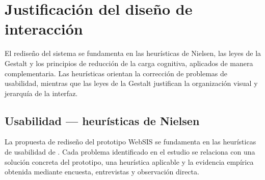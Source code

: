 \section{Justificación del diseño de interacción}

El rediseño del sistema se fundamenta en las heurísticas de Nielsen, las leyes de la Gestalt y los principios de reducción de la carga cognitiva, aplicados de manera complementaria. Las heurísticas orientan la corrección de problemas de usabilidad, mientras que las leyes de la Gestalt justifican la organización visual y jerarquía de la interfaz.

\subsection{Usabilidad — heurísticas de Nielsen}

La propuesta de rediseño del prototipo WebSIS se fundamenta en las heurísticas de usabilidad de \textcite{nielsen1994}. Cada problema identificado en el estudio se relaciona con una solución concreta del prototipo, una heurística aplicable y la evidencia empírica obtenida mediante encuesta, entrevistas y observación directa.

